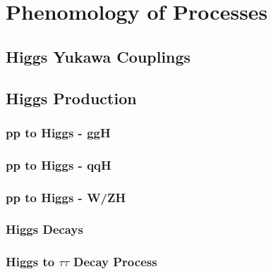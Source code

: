\chapter{Phenomology of Processes}

\section{Higgs Yukawa Couplings}

\section{Higgs Production}

\subsection{pp to Higgs - ggH}

\subsection{pp to Higgs - qqH}

\subsection{pp to Higgs - W/ZH}

\subsection{Higgs Decays}

\subsection{Higgs to $\tau\tau$ Decay Process}

